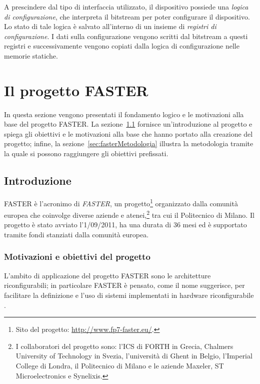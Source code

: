 A prescindere dal tipo di interfaccia utilizzato, il dispositivo possiede una
\emph{logica di configurazione}, che interpreta il bitstream per poter configurare
il dispositivo. Lo stato di tale logica è salvato all'interno di un insieme di \emph{registri di configurazione}.
I dati sulla configurazione vengono scritti dal bitstream a questi registri e successivamente
vengono copiati dalla logica di configurazione nelle memorie statiche.


\section[Il progetto \acs{FASTER}]{Il progetto \acs{FASTER}}
\label{sec:progettoFASTER}
In questa sezione vengono presentati il fondamento logico e le motivazioni alla 
base del progetto \acs{FASTER}. La sezione~\ref{subsec:fasterIntro} fornisce 
un'introduzione al progetto e spiega gli obiettivi e le motivazioni alla 
base che hanno portato alla creazione del progetto; infine, la
sezione~\ref{sec:fasterMetodologia} illustra la metodologia tramite la quale si possono 
raggiungere gli obiettivi prefissati.




\subsection{Introduzione}
\label{subsec:fasterIntro}
\acs{FASTER} è l'acronimo di \emph{\ac{FASTER}}, un progetto\footnote{Sito del 
progetto: \url{http://www.fp7-faster.eu/}.} organizzato dalla comunità europea 
che coinvolge diverse aziende e atenei,\footnote{I collaboratori del progetto 
sono: l'\ac{ICS} di \ac{FORTH} in Grecia, Chalmers University of Technology in 
Svezia, l'università di Ghent in Belgio, l'Imperial College di Londra, il 
Politecnico di Milano e le aziende Maxeler, ST Microelectronics e Synelixis.} 
tra cui il Politecnico di Milano. Il progetto è stato avviato l'1/09/2011,
ha una durata di 36 mesi ed è supportato tramite fondi stanziati dalla 
comunità europea.

\subsubsection{Motivazioni e obiettivi del progetto}
L'ambito di applicazione del progetto \ac{FASTER} sono le architetture 
riconfigurabili; in particolare \ac{FASTER} è pensato, come il nome 
suggerisce, per facilitare la definizione e l'uso di sistemi implementati in 
hardware riconfigurabile \cite{FasterPaper}.

